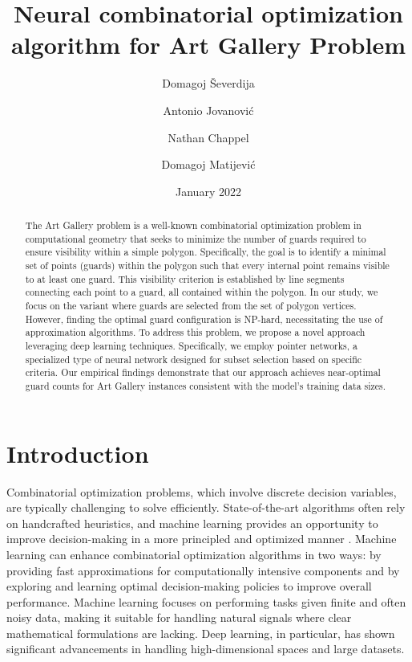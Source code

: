 \documentclass{article}
\title{Neural combinatorial optimization algorithm for Art Gallery Problem}
\author{Domagoj Ševerdija \and Antonio Jovanović \and Nathan Chappel \and Domagoj Matijević  }
\date{January 2022}
\begin{document}
\maketitle

\begin{abstract}
 The Art Gallery problem is a well-known combinatorial optimization problem in computational geometry that seeks to minimize the number of guards required to ensure visibility within a simple polygon. Specifically, the goal is to identify a minimal set of points (guards) within the polygon such that every internal point remains visible to at least one guard. This visibility criterion is established by line segments connecting each point to a guard, all contained within the polygon. In our study, we focus on the variant where guards are selected from the set of polygon vertices. However, finding the optimal guard configuration is NP-hard, necessitating the use of approximation algorithms. To address this problem, we propose a novel approach leveraging deep learning techniques. Specifically, we employ pointer networks, a specialized type of neural network designed for subset selection based on specific criteria. 
Our empirical findings demonstrate that our approach achieves near-optimal guard counts for Art Gallery instances consistent with the model’s training data sizes. 
\end{abstract}



\section{Introduction}


Combinatorial optimization problems, which involve discrete decision variables, are typically challenging to solve efficiently. State-of-the-art algorithms often rely on handcrafted heuristics, and machine learning provides an opportunity to improve decision-making in a more principled and optimized manner \cite{survey:BENGIO2021405}. Machine learning can enhance combinatorial optimization algorithms in two ways: by providing fast approximations for computationally intensive components and by exploring and learning optimal decision-making policies to improve overall performance. Machine learning focuses on performing tasks given finite and often noisy data, making it suitable for handling natural signals where clear mathematical formulations are lacking. Deep learning, in particular, has shown significant advancements in handling high-dimensional spaces and large datasets.
\end{document}
